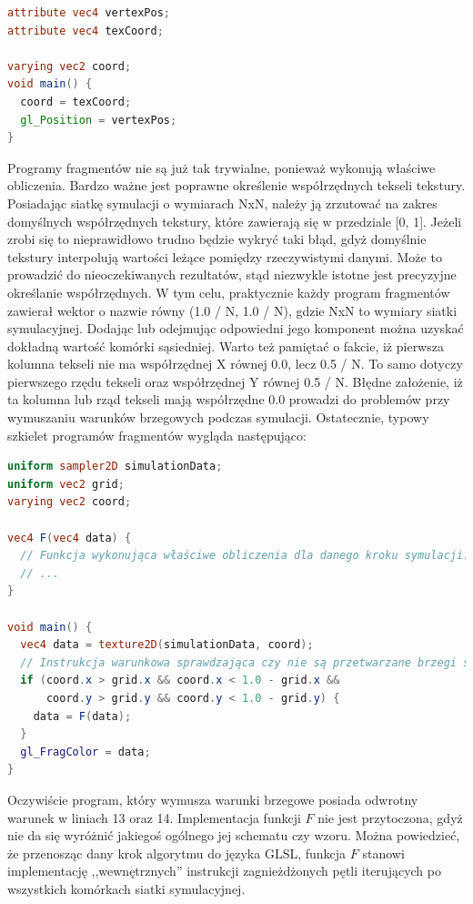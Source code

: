 \begin{lstlisting}[language=GLSL, caption=Typowa implementacja programu
wierzchołków w symulatorze \ow{Energy2D} (język GLSL)]
attribute vec4 vertexPos;
attribute vec4 texCoord;

varying vec2 coord;
void main() {
  coord = texCoord;
  gl_Position = vertexPos;
}
\end{lstlisting}

Programy fragmentów nie są już tak trywialne, ponieważ wykonują właściwe
obliczenia. Bardzo ważne jest poprawne określenie współrzędnych tekseli
tekstury. Posiadając siatkę symulacji o wymiarach NxN, należy ją zrzutować na
zakres domyślnych współrzędnych tekstury, które zawierają się w przedziale [0,
1]. Jeżeli zrobi się to nieprawidłowo trudno będzie wykryć taki błąd, gdyż
domyślnie tekstury interpolują wartości leżące pomiędzy rzeczywistymi danymi.
Może to prowadzić do nieoczekiwanych rezultatów, stąd niezwykle istotne jest
precyzyjne określanie współrzędnych. W tym celu, praktycznie każdy program
fragmentów zawierał wektor o nazwie  równy (1.0 / N, 1.0 / N), gdzie
NxN to wymiary siatki symulacyjnej. Dodając lub odejmując odpowiedni jego
komponent można uzyskać dokładną wartość komórki sąsiedniej. Warto też
pamiętać o fakcie, iż pierwsza kolumna tekseli nie ma współrzędnej X równej
0.0, lecz 0.5 / N. To samo dotyczy pierwszego rzędu tekseli oraz współrzędnej
Y równej 0.5 / N. Błędne założenie, iż ta kolumna lub rząd tekseli mają
współrzędne 0.0 prowadzi do problemów przy wymuszaniu warunków brzegowych
podczas symulacji. Ostatecznie, typowy szkielet programów fragmentów wygląda
następująco:

\begin{lstlisting}[language=GLSL, caption=Szkielet implementacji programu
fragmentów w symulatorze \ow{Energy2D} (język GLSL)]
uniform sampler2D simulationData;
uniform vec2 grid;
varying vec2 coord;

vec4 F(vec4 data) {
  // Funkcja wykonująca właściwe obliczenia dla danego kroku symulacji.
  // ...
}

void main() {
  vec4 data = texture2D(simulationData, coord);
  // Instrukcja warunkowa sprawdzająca czy nie są przetwarzane brzegi siatki.
  if (coord.x > grid.x && coord.x < 1.0 - grid.x &&
      coord.y > grid.y && coord.y < 1.0 - grid.y) {
    data = F(data);
  }
  gl_FragColor = data;
}
\end{lstlisting}

Oczywiście program, który wymusza warunki brzegowe posiada odwrotny warunek w
liniach 13 oraz 14. Implementacja funkcji $F$ nie jest przytoczona, gdyż nie
da się wyróżnić jakiegoś ogólnego jej schematu czy wzoru. Można powiedzieć, że
przenosząc dany krok algorytmu do języka GLSL, funkcja $F$ stanowi
implementację ,,wewnętrznych'' instrukcji zagnieżdżonych pętli iterujących po
wszystkich komórkach siatki symulacyjnej.



